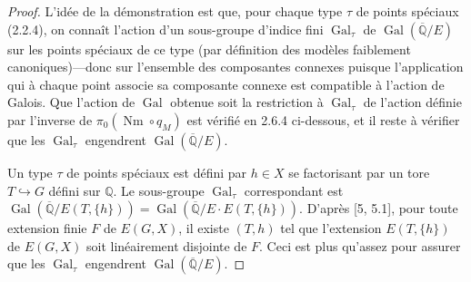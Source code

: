 \documentclass[12pt,a4paper]{article}
\theoremstyle{plain}
\theoremstyle{definition}
\theoremstyle{remark}
\DeclareMathOperator{\Gal}{Gal}
\DeclareMathOperator{\Nm}{Nm}
\newcommand{\QQ}{\mathbb{Q}}
\begin{document}
\begin{proof}
L'id\'ee de la d\'emonstration est que, pour chaque type $\tau$ de points sp\'eciaux (2.2.4), on conna\^it l'action d'un sous-groupe d'indice fini $\Gal_\tau$ de $\Gal(\overline{\QQ}/E)$ sur les points sp\'eciaux de ce type (par d\'efinition des mod\`eles faiblement canoniques)---donc sur l'ensemble des composantes connexes puisque l'application qui \`a chaque point associe sa composante connexe est compatible \`a l'action de Galois. Que l'action de $\Gal$ obtenue soit la restriction \`a $\Gal_\tau$ de l'action d\'efinie par l'inverse de $\pi_0(\Nm \circ q_M)$ est v\'erifi\'e en 2.6.4 ci-dessous, et il reste \`a v\'erifier que les $\Gal_\tau$ engendrent $\Gal(\overline{\QQ}/E)$.

Un type $\tau$ de points sp\'eciaux est d\'efini par $h \in X$ se factorisant par un tore $T \hookrightarrow G$ d\'efini sur $\QQ$. Le sous-groupe $\Gal_\tau$ correspondant est $\Gal(\overline{\QQ}/E(T,\{h\})) = \Gal(\overline{\QQ}/E \cdot E(T,\{h\}))$. D'apr\`es [5, 5.1], pour toute extension finie $F$ de $E(G,X)$, il existe $(T,h)$ tel que l'extension $E(T,\{h\})$ de $E(G,X)$ soit lin\'eairement disjointe de $F$. Ceci est plus qu'assez pour assurer que les $\Gal_\tau$ engendrent $\Gal(\overline{\QQ}/E)$.
\end{proof}

\subsubsection{}
\end{document}
